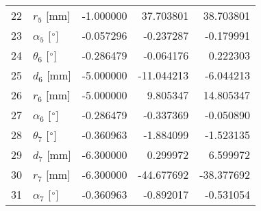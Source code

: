 \documentclass{standalone}%
\begin{document}
\begin{tabular}{llrrr}
22 &              $r_{5}$ [mm] &  -1.000000 &  37.703801 &  38.703801 \\
23 &  $\alpha_{5}$ [$\degree$] &  -0.057296 &  -0.237287 &  -0.179991 \\
24 &  $\theta_{6}$ [$\degree$] &  -0.286479 &  -0.064176 &   0.222303 \\
25 &              $d_{6}$ [mm] &  -5.000000 & -11.044213 &  -6.044213 \\
26 &              $r_{6}$ [mm] &  -5.000000 &   9.805347 &  14.805347 \\
27 &  $\alpha_{6}$ [$\degree$] &  -0.286479 &  -0.337369 &  -0.050890 \\
28 &  $\theta_{7}$ [$\degree$] &  -0.360963 &  -1.884099 &  -1.523135 \\
29 &              $d_{7}$ [mm] &  -6.300000 &   0.299972 &   6.599972 \\
30 &              $r_{7}$ [mm] &  -6.300000 & -44.677692 & -38.377692 \\
31 &  $\alpha_{7}$ [$\degree$] &  -0.360963 &  -0.892017 &  -0.531054 \\
\bottomrule
\end{tabular}
%
\end{document}
